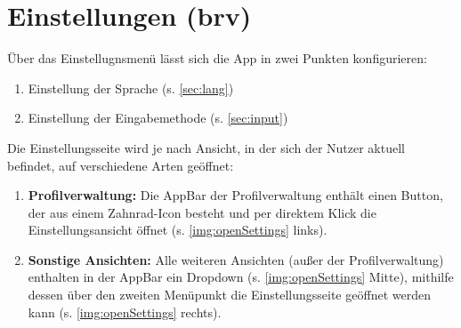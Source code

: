 \chapter{Einstellungen (brv)}
\label{chap:settings}

Über das Einstellugnsmenü lässt sich die App in zwei Punkten konfigurieren:

\begin{enumerate}
	\item Einstellung der Sprache (s. \cref{sec:lang})
	\item Einstellung der Eingabemethode (s. \cref{sec:input})
\end{enumerate}

Die Einstellungsseite wird je nach Ansicht, in der sich der Nutzer aktuell befindet, auf verschiedene Arten geöffnet:

\begin{enumerate}
	\item \textbf{Profilverwaltung:} Die AppBar der Profilverwaltung enthält einen Button, der aus einem Zahnrad-Icon besteht und per direktem Klick die Einstellungsansicht öffnet (s. \cref{img:openSettings} links).
	\item \textbf{Sonstige Ansichten:} Alle weiteren Ansichten (außer der Profilverwaltung) enthalten in der AppBar ein Dropdown (s. \cref{img:openSettings} Mitte), mithilfe dessen über den zweiten Menüpunkt die Einstellungsseite geöffnet werden kann (s. \cref{img:openSettings} rechts).
\end{enumerate}

